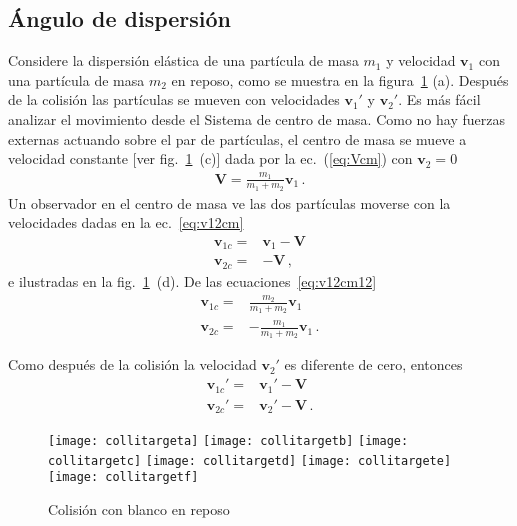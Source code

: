\subsection{Ángulo de dispersión}
Considere la dispersión elástica de una partícula de masa $m_1$ y
velocidad $\mathbf{v}_1$ con una partícula de masa $m_2$ en reposo,
como se muestra en la figura~\ref{fig:collitarget} (a). 
Después de la colisión las partículas se mueven con velocidades
$\mathbf{v}_1'$ y $\mathbf{v}_2'$.
Es más fácil analizar el movimiento desde el Sistema de centro de
masa. 
Como no hay fuerzas externas actuando sobre el par de partículas, el
centro de masa se mueve a velocidad constante [ver
fig.~\ref{fig:collitarget}~(c)] dada por la ec.~(\ref{eq:Vcm}) con
$\mathbf{v}_2=0$
\begin{align}
  \label{eq:Vv20}
  \mathbf{V}=\frac{m_1}{m_1+m_2}\mathbf{v}_1\,.
\end{align}
Un observador en el centro de masa ve las dos partículas moverse con
la velocidades dadas en la ec.~\eqref{eq:v12cm}
\begin{align*}
  \mathbf{v}_{1c} =&\mathbf{v}_1-\mathbf{V}\nonumber\\
  \mathbf{v}_{2c}=&-\mathbf{V}\,,
\end{align*}
e ilustradas en la fig.~\ref{fig:collitarget}~(d). De las ecuaciones~\eqref{eq:v12cm12}
\begin{align}
  \label{eq:v12cm12v20}
  \mathbf{v}_{1c}
    =&\frac{m_2}{m_1+m_2}\mathbf{v}_1\nonumber\\
 \mathbf{v}_{2c}=&-\frac{m_1}{m_1+m_2}\mathbf{v}_1\,.
\end{align}


Como después de la colisión la velocidad $\mathbf{v}_2'$ es diferente
de cero, entonces
\begin{align}
  \label{eq:v12c}
  \mathbf{v}_{1c}' =&\mathbf{v}_1'-\mathbf{V}\nonumber\\
  \mathbf{v}_{2c}'=&\mathbf{v}_2'-\mathbf{V}\,.
\end{align}

\begin{frame}
\begin{figure}
  \centering
{\texttt{[image: collitargeta]}}
{\texttt{[image: collitargetb]}}\nobreakinbeamer
{\texttt{[image: collitargetc]}}
{\texttt{[image: collitargetd]}}\nobreakinbeamer
{\texttt{[image: collitargete]}}
{\texttt{[image: collitargetf]}}
  \caption{Colisión con blanco en reposo}
  \label{fig:collitarget}
\end{figure}
\end{frame}

